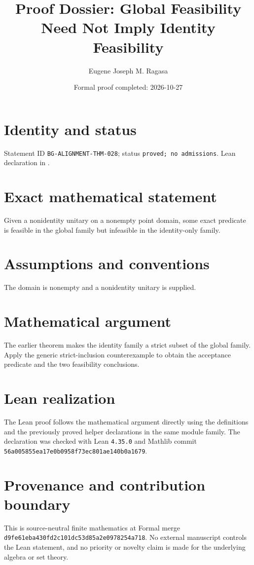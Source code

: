 \documentclass[11pt]{article}
\title{Proof Dossier: Global Feasibility Need Not Imply Identity Feasibility}
\author{Eugene Joseph M. Ragasa}
\date{Formal proof completed: 2026-10-27}
\begin{document}
\raggedright
\maketitle

\section{Identity and status}
Statement ID \texttt{BG-ALIGNMENT-THM-028}; status \texttt{proved; no admissions}.  Lean declaration
 in
.

\section{Exact mathematical statement}
Given a nonidentity unitary on a nonempty point domain, some exact predicate is feasible in the global family but infeasible in the identity-only family.

\section{Assumptions and conventions}
The domain is nonempty and a nonidentity unitary is supplied.

\section{Mathematical argument}
The earlier theorem makes the identity family a strict subset of the global family.  Apply the generic strict-inclusion counterexample to obtain the acceptance predicate and the two feasibility conclusions.

\section{Lean realization}
The Lean proof follows the mathematical argument directly using the definitions and the
previously proved helper declarations in the same module family.  The declaration was checked
with Lean \texttt{4.35.0} and Mathlib commit \texttt{56a005855ea17e0b0958f73ec801ae140b0a1679}.

\section{Provenance and contribution boundary}
This is source-neutral finite mathematics at Formal merge
\texttt{d9fe61eba430fd2c101dc53d85a2e0978254a718}.  No external manuscript controls the Lean statement, and no priority or
novelty claim is made for the underlying algebra or set theory.
\end{document}
